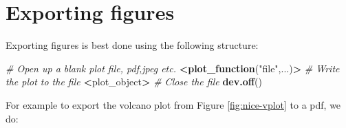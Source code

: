 \documentclass[12pt,]{book}
\newenvironment{Shaded}{\begin{snugshade}}{\end{snugshade}}
\newcommand{\KeywordTok}[1]{\textcolor[rgb]{0.13,0.29,0.53}{\textbf{#1}}}
\newcommand{\StringTok}[1]{\textcolor[rgb]{0.31,0.60,0.02}{#1}}
\newcommand{\CommentTok}[1]{\textcolor[rgb]{0.56,0.35,0.01}{\textit{#1}}}
\newcommand{\OperatorTok}[1]{\textcolor[rgb]{0.81,0.36,0.00}{\textbf{#1}}}
\newcommand{\ErrorTok}[1]{\textcolor[rgb]{0.64,0.00,0.00}{\textbf{#1}}}
\newcommand{\NormalTok}[1]{#1}
\theoremstyle{definition}
\theoremstyle{definition}
\theoremstyle{definition}
\theoremstyle{remark}
\begin{document}
\section{Exporting figures}\label{exporting-figures}

Exporting figures is best done using the following structure:

\begin{Shaded}
\begin{Highlighting}[]
\CommentTok{# Open up a blank plot file, pdf,jpeg etc.}
\OperatorTok{<}\KeywordTok{plot_function}\NormalTok{(}\StringTok{"file"}\NormalTok{,...)}\OperatorTok{>}
\CommentTok{# Write the plot to the file}
\ErrorTok{<}\NormalTok{plot_object}\OperatorTok{>}
\CommentTok{# Close the file}
\KeywordTok{dev.off}\NormalTok{()}
\end{Highlighting}
\end{Shaded}

For example to export the volcano plot from Figure \ref{fig:nice-vplot}
to a pdf, we do:
\end{document}
